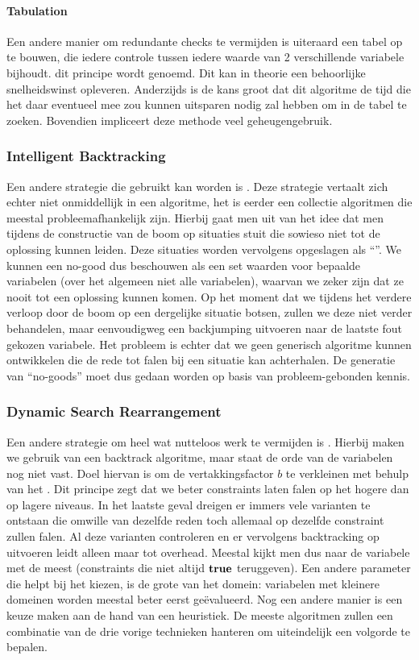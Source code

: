 \paragraph{Tabulation}
Een andere manier om redundante checks te vermijden is uiteraard een tabel op te bouwen, die iedere controle tussen iedere waarde van 2 verschillende variabele bijhoudt. dit principe wordt  genoemd. Dit kan in theorie een behoorlijke snelheidswinst opleveren. Anderzijds is de kans groot dat dit algoritme de tijd die het daar eventueel mee zou kunnen uitsparen nodig zal hebben om in de tabel te zoeken. Bovendien impliceert deze methode veel geheugengebruik.
\subsubsection{Intelligent Backtracking}
Een andere strategie die gebruikt kan worden is . Deze strategie vertaalt zich echter niet onmiddellijk in een algoritme, het is eerder een collectie algoritmen die meestal probleemafhankelijk zijn. Hierbij gaat men uit van het idee dat men tijdens de constructie van de boom op situaties stuit die sowieso niet tot de oplossing kunnen leiden. Deze situaties worden vervolgens opgeslagen als ``''. We kunnen een no-good dus beschouwen als een set waarden voor bepaalde variabelen (over het algemeen niet alle variabelen), waarvan we zeker zijn dat ze nooit tot een oplossing kunnen komen. Op het moment dat we tijdens het verdere verloop door de boom op een dergelijke situatie botsen, zullen we deze niet verder behandelen, maar eenvoudigweg een backjumping uitvoeren naar de laatste fout gekozen variabele. Het probleem is echter dat we geen generisch algoritme kunnen ontwikkelen die de rede tot falen bij een situatie kan achterhalen. De generatie van ``no-goods'' moet dus gedaan worden op basis van probleem-gebonden kennis.
\subsubsection{Dynamic Search Rearrangement}
\label{sss:dynamicSearchRearrangement}
Een andere strategie om heel wat nutteloos werk te vermijden is . Hierbij maken we gebruik van een backtrack algoritme, maar staat de orde van de variabelen nog niet vast. Doel hiervan is om de vertakkingsfactor $b$ te verkleinen met behulp van het . Dit principe zegt dat we beter constraints laten falen op het hogere dan op lagere niveaus. In het laatste geval dreigen er immers vele varianten te ontstaan die omwille van dezelfde reden toch allemaal op dezelfde constraint zullen falen. Al deze varianten controleren en er vervolgens backtracking op uitvoeren leidt alleen maar tot overhead. Meestal kijkt men dus naar de variabele met de meest  (constraints die niet altijd $\mbox{\bf true}$ teruggeven). Een andere parameter die helpt bij het kiezen, is de grote van het domein: variabelen met kleinere domeinen worden meestal beter eerst geëvalueerd. Nog een andere manier is een keuze maken aan de hand van een heuristiek. De meeste algoritmen zullen een combinatie van de drie vorige technieken hanteren om uiteindelijk een volgorde te bepalen.

